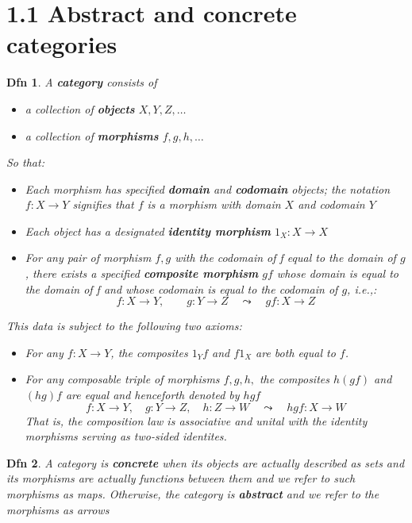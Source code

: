 \documentclass{article}
\theoremstyle{spacious}
\newtheorem*{dfn}{Dfn}
\renewcommand{\:}{\vcentcolon=} %
\begin{document}

\section*{1.1 Abstract and concrete categories}

\begin{dfn} A \textbf{category} consists of 
    \begin{itemize}
        \item a collection of \textbf{objects} \(X,Y,Z,\ldots\)
        \item a collection of \textbf{morphisms} \(f,g,h,\ldots\)
    \end{itemize}
So that:
\begin{itemize}
    \item Each morphism has specified \textbf{domain} and \textbf{codomain} objects; the notation \(f:X \to Y\) signifies that \(f\) is a morphism with domain \(X\) and codomain \(Y\)
    \item Each object has a designated \textbf{identity morphism} \(1_X:X \to X\)
    \item For any pair of morphism \(f,g\)  with the codomain of f equal to the domain of \(g\), there exists a specified \textbf{composite morphism} \(g f\) whose domain is equal to the domain of f and whose codomain is equal to the codomain of \(g\), i.e.,:
    \[
        f: X\to Y,\qquad g:Y\to Z \quad \leadsto \quad gf: X \to Z
    \]
\end{itemize}
This data is subject to the following two axioms:
\begin{itemize}
    \item For any \(f:X \to Y\), the composites \(1_Y f\) and \(f 1_X\) are both equal to \(f\).
    \item For any composable triple of morphisms \(f,g,h,\) the composites \(h(gf)\) and \((hg)f\) are equal and henceforth denoted by \(hgf\)
    \[
        f:X\to Y, \quad g:Y\to Z, \quad h:Z\to W \quad \leadsto \quad hgf: X \to W
    \]
That is, the composition law is associative and unital with the identity morphisms serving as two-sided identites.
\end{itemize}
\end{dfn}

\begin{dfn} A category is \textbf{concrete} when its objects are actually described as sets and its morphisms are actually functions between them and we refer to such morphisms as maps.  Otherwise, the category is \textbf{abstract} and we refer to the morphisms as arrows
    
\end{dfn}
\end{document}
